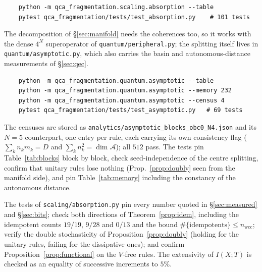 \documentclass[11pt]{article}
\newcommand{\fn}[1]{\texttt{#1}}
\theoremstyle{plain}
\theoremstyle{definition}
\theoremstyle{remark}
\begin{document}
\begin{verbatim}
    python -m qca_fragmentation.scaling.absorption --table
    pytest qca_fragmentation/tests/test_absorption.py    # 101 tests
\end{verbatim}

\noindent The decomposition of \S\ref{sec:manifold} needs the coherences too,
so it works with the dense $4^N$ superoperator of \fn{quantum/peripheral.py};
the splitting itself lives in \fn{quantum/asymptotic.py}, which also carries the
basin and autonomous-distance measurements of \S\ref{sec:qec}.

\begin{verbatim}
    python -m qca_fragmentation.quantum.asymptotic --table
    python -m qca_fragmentation.quantum.asymptotic --memory 232
    python -m qca_fragmentation.quantum.asymptotic --census 4
    pytest qca_fragmentation/tests/test_asymptotic.py   # 69 tests
\end{verbatim}

\noindent The censuses are stored as
\fn{analytics/asymptotic\_blocks\_obc0\_N4.json} and its $N=5$ counterpart, one
entry per rule, each carrying its own consistency flag ($\sum_k n_k m_k = D$ and
$\sum_k n_k^2 = \dim\mathcal{A}$); all $512$ pass. The tests pin
Table~\ref{tab:blocks} block by block, check seed-independence of the centre
splitting, confirm that unitary rules lose nothing
(Prop.~\ref{prop:doubly} seen from the manifold side), and pin
Table~\ref{tab:memory} including the constancy of the autonomous distance.

\noindent The tests of \fn{scaling/absorption.py} pin every number quoted in
\S\ref{sec:measured} and
\S\ref{sec:bits}; check both directions of Theorem~\ref{prop:idem}, including
the idempotent counts $19/19$, $9/28$ and $0/13$ and the bound
$\#\{\text{idempotents}\} \le n_{\mathrm{wcc}}$; verify the double stochasticity
of Proposition~\ref{prop:doubly} (holding for the unitary rules, failing for
the dissipative ones); and confirm Proposition~\ref{prop:functional} on the
$V$-free rules. The extensivity of $I(X;T)$ is checked as an equality of
successive increments to $5\%$.
\end{document}
